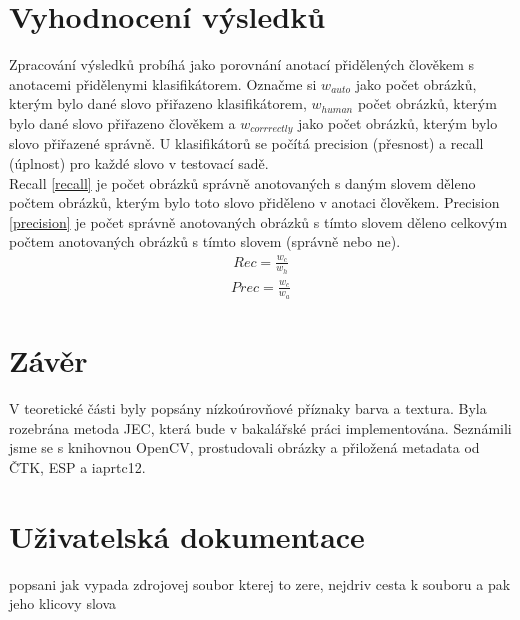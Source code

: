 \documentclass[czech,BP]{thesiskiv}
\begin{document}
\chapter{Vyhodnocení výsledků}
Zpracování výsledků probíhá jako porovnání anotací přidělených člověkem s anotacemi přidělenymi klasifikátorem. Označme si $w_{auto}$ jako počet obrázků, kterým bylo dané slovo přiřazeno klasifikátorem, $w_{human}$ počet obrázků, kterým bylo dané slovo přiřazeno člověkem a $w_{corrrectly}$ jako počet obrázků, kterým bylo slovo přiřazené správně. U klasifikátorů se počítá precision (přesnost) a recall (úplnost) pro každé slovo v testovací sadě.\\
Recall \eqref{recall} je počet obrázků správně anotovaných s daným slovem děleno počtem obrázků, kterým bylo toto slovo přiděleno v anotaci člověkem. Precision \eqref{precision} je počet správně anotovaných obrázků s tímto slovem děleno celkovým počtem anotovaných obrázků s tímto slovem (správně nebo ne). \cite{Result_A_A}
\begin{align}
   \label{recall} Rec = \frac{w_c}{w_h}
\end{align}
\begin{align}
   \label{precision} Prec = \frac{w_c}{w_a}
\end{align}


\chapter{Závěr}
V teoretické části byly popsány nízkoúrovňové příznaky barva a textura. Byla rozebrána metoda JEC, která bude v bakalářské práci implementována. Seznámili jsme se s knihovnou OpenCV, prostudovali obrázky a přiložená metadata od ČTK, ESP a iaprtc12. 

\chapter{Uživatelská dokumentace}
popsani jak vypada zdrojovej soubor kterej to zere, nejdriv cesta k souboru a pak jeho klicovy slova
 
% 
%

{\raggedright\small

}
\end{document}
